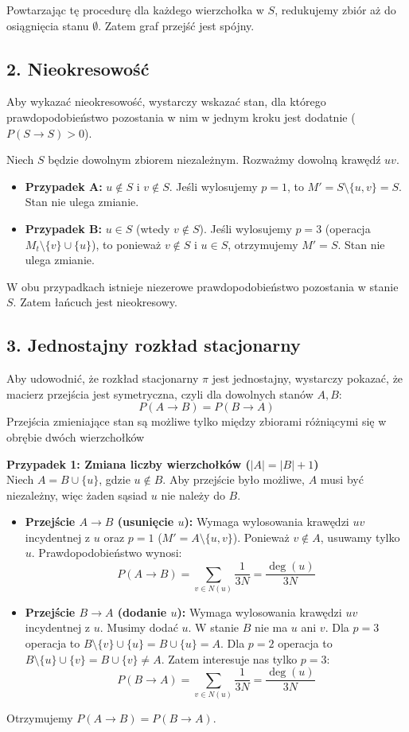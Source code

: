Powtarzając tę procedurę dla każdego wierzchołka w \(S\), redukujemy zbiór aż do osiągnięcia stanu \(\emptyset\). Zatem graf przejść jest spójny.

\subsection*{2. Nieokresowość}

Aby wykazać nieokresowość, wystarczy wskazać stan, dla którego prawdopodobieństwo pozostania w nim w jednym kroku jest dodatnie (\(P(S \to S) > 0\)).

Niech \(S\) będzie dowolnym zbiorem niezależnym. Rozważmy dowolną krawędź \(uv\).
\begin{itemize}
	\item \textbf{Przypadek A:} \(u \notin S\) i \(v \notin S\).
	      Jeśli wylosujemy \(p=1\), to \(M' = S \setminus \{u, v\} = S\). Stan nie ulega zmianie.
	\item \textbf{Przypadek B:} \(u \in S\) (wtedy \(v \notin S\)).
	      Jeśli wylosujemy \(p=3\) (operacja \(M_t \setminus \{v\} \cup \{u\}\)), to ponieważ \(v \notin S\) i \(u \in S\), otrzymujemy \(M' = S\). Stan nie ulega zmianie.
\end{itemize}
W obu przypadkach istnieje niezerowe prawdopodobieństwo pozostania w stanie \(S\). Zatem łańcuch jest nieokresowy.

\subsection*{3. Jednostajny rozkład stacjonarny}

Aby udowodnić, że rozkład stacjonarny \(\pi\) jest jednostajny, wystarczy pokazać, że macierz przejścia jest symetryczna, czyli dla dowolnych stanów \(A, B\):
\[ P(A \to B) = P(B \to A) \]
Przejścia zmieniające stan są możliwe tylko między zbiorami różniącymi się w obrębie dwóch wierzchołków

\textbf{Przypadek 1: Zmiana liczby wierzchołków (\(|A| = |B| + 1\))} \\
Niech \(A = B \cup \{u\}\), gdzie \(u \notin B\). Aby przejście było możliwe, \(A\) musi być niezależny, więc żaden sąsiad \(u\) nie należy do \(B\).
\begin{itemize}
	\item \textbf{Przejście \(A \to B\) (usunięcie \(u\)):} Wymaga wylosowania krawędzi \(uv\) incydentnej z \(u\) oraz \(p=1\) (\(M' = A \setminus \{u, v\}\)). Ponieważ \(v \notin A\), usuwamy tylko \(u\). Prawdopodobieństwo wynosi:
	      \[ P(A \to B) = \sum_{v \in N(u)} \frac{1}{3N} = \frac{\deg(u)}{3N} \]
	\item \textbf{Przejście \(B \to A\) (dodanie \(u\)):} Wymaga wylosowania krawędzi \(uv\) incydentnej z \(u\). Musimy dodać \(u\). W stanie \(B\) nie ma \(u\) ani \(v\).
	      Dla \(p=3\) operacja to \(B \setminus \{v\} \cup \{u\} = B \cup \{u\} = A\).
	      Dla \(p=2\) operacja to \(B \setminus \{u\} \cup \{v\} = B \cup \{v\} \neq A\).
	      Zatem interesuje nas tylko \(p=3\):
	      \[ P(B \to A) = \sum_{v \in N(u)} \frac{1}{3N} = \frac{\deg(u)}{3N} \]
\end{itemize}
Otrzymujemy \(P(A \to B) = P(B \to A)\).

